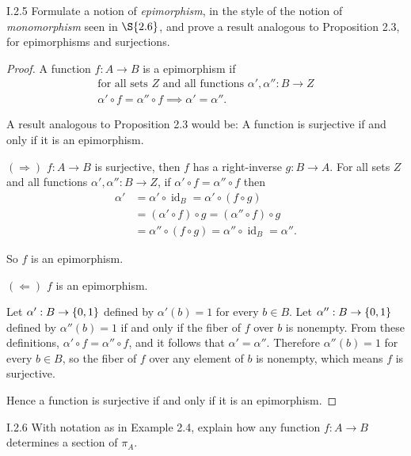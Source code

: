 \begin{exercise}{I.2.5}
	Formulate a notion of \textit{epimorphism}, in the style of the notion of \textit{monomorphism} seen in $\S{2.6}$, and prove a result analogous to Proposition 2.3, for epimorphisms and surjections.
\end{exercise}

\begin{proof}
	A function $f: A\to B$ is a epimorphism if
	\begin{equation*}
		\begin{gathered}
			\text{for all sets $Z$ and all functions $\alpha', \alpha'': B\to Z$} \\
			\alpha'\circ f = \alpha''\circ f \implies \alpha' = \alpha''.
		\end{gathered}
	\end{equation*}

	A result analogous to Proposition 2.3 would be: A function is surjective if and only if it is an epimorphism.

	$(\Longrightarrow)$ $f: A\to B$ is surjective, then $f$ has a right-inverse $g: B\to A$. For all sets $Z$ and all functions $\alpha', \alpha'': B\to Z$, if $\alpha'\circ f = \alpha''\circ f$ then
	\begin{align*}
		\alpha' & = \alpha'\circ \operatorname{id}_{B} = \alpha'\circ (f\circ g)                \\
		        & = (\alpha'\circ f)\circ g = (\alpha''\circ f)\circ g                          \\
		        & = \alpha'' \circ (f\circ g) = \alpha''\circ \operatorname{id}_{B} = \alpha''.
	\end{align*}

	So $f$ is an epimorphism.

	$(\Longleftarrow)$ $f$ is an epimorphism.

	Let $\alpha': B\to \left\{{0, 1}\right\}$ defined by $\alpha'(b) = 1$ for every $b\in B$. Let $\alpha'': B\to \left\{{0, 1}\right\}$ defined by $\alpha''(b) = 1$ if and only if the fiber of $f$ over $b$ is nonempty. From these definitions, $\alpha'\circ f = \alpha''\circ f$, and it follows that $\alpha' = \alpha''$. Therefore $\alpha''(b) = 1$ for every $b\in B$, so the fiber of $f$ over any element of $b$ is nonempty, which means $f$ is surjective.

	Hence a function is surjective if and only if it is an epimorphism.
\end{proof}

\begin{exercise}{I.2.6}
	With notation as in Example 2.4, explain how any function $f: A\to B$ determines a section of $\pi_{A}$.
\end{exercise}

